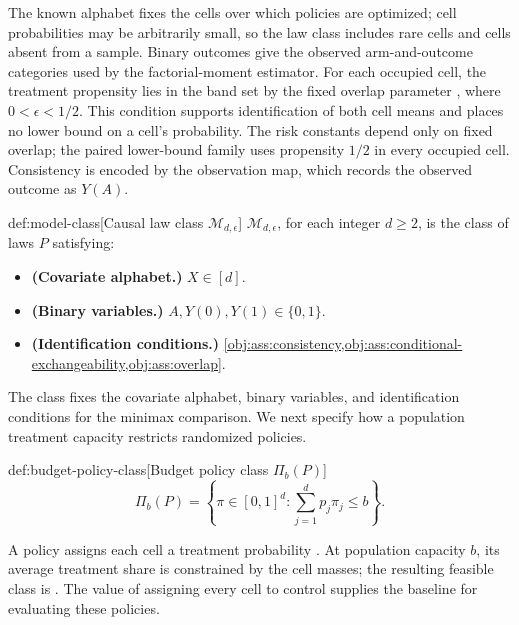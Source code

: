 The known alphabet fixes the cells over which policies are optimized; cell probabilities may be arbitrarily small, so the law class includes rare cells and cells absent from a sample. Binary outcomes give the observed arm-and-outcome categories used by the factorial-moment estimator. For each occupied cell, the treatment propensity  lies in the band set by the fixed overlap parameter , where \(0<\epsilon<1/2\). This condition supports identification of both cell means \citep{RosenbaumRubin1983} and places no lower bound on a cell’s probability. The risk constants depend only on fixed overlap; the paired lower-bound family uses propensity \(1/2\) in every occupied cell. Consistency is encoded by the observation map, which records the observed outcome as \(Y(A)\).

\begin{definitionv}{def:model-class}[Causal law class \(\mathcal M_{d,\epsilon}\)]
\(\mathcal M_{d,\epsilon}\), for each integer \(d\ge2\), is the class of laws \(P\) satisfying:
\begin{itemize}
\item \textbf{(Covariate alphabet.)} \(X\in[d]\).
\item \textbf{(Binary variables.)} \(A,Y(0),Y(1)\in\{0,1\}\).
\item \textbf{(Identification conditions.)} \cref{obj:ass:consistency,obj:ass:conditional-exchangeability,obj:ass:overlap}.
\end{itemize}
\end{definitionv}

The class  fixes the covariate alphabet, binary variables, and identification conditions for the minimax comparison. We next specify how a population treatment capacity restricts randomized policies.

\begin{definitionv}{def:budget-policy-class}[Budget policy class \(\Pi_b(P)\)]
\[
\Pi_b(P)=\left\{\pi\in[0,1]^d:\sum_{j=1}^d p_j\pi_j\le b\right\}.
\]
\end{definitionv}

A policy assigns each cell a treatment probability . At population capacity \(b\), its average treatment share is constrained by the cell masses; the resulting feasible class is . The value of assigning every cell to control supplies the baseline for evaluating these policies.

